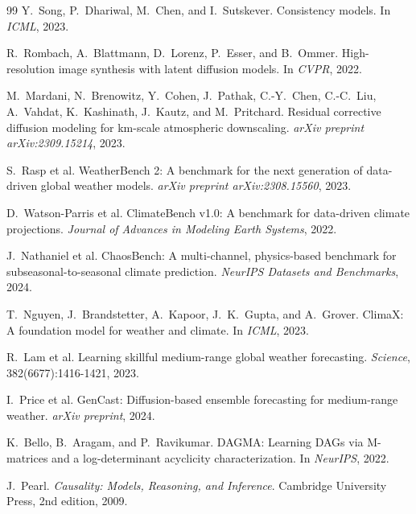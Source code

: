 \documentclass[14pt,a4paper,openany]{extreport}
\begin{document}
\begin{thebibliography}{99}
 Y.~Song, P.~Dhariwal, M.~Chen, and I.~Sutskever. Consistency models. In \emph{ICML}, 2023.

 R.~Rombach, A.~Blattmann, D.~Lorenz, P.~Esser, and B.~Ommer. High-resolution image synthesis with latent diffusion models. In \emph{CVPR}, 2022.

 M.~Mardani, N.~Brenowitz, Y.~Cohen, J.~Pathak, C.-Y.~Chen, C.-C.~Liu, A.~Vahdat, K.~Kashinath, J.~Kautz, and M.~Pritchard. Residual corrective diffusion modeling for km-scale atmospheric downscaling. \emph{arXiv preprint arXiv:2309.15214}, 2023.

 S.~Rasp et al. WeatherBench 2: A benchmark for the next generation of data-driven global weather models. \emph{arXiv preprint arXiv:2308.15560}, 2023.

 D.~Watson-Parris et al. ClimateBench v1.0: A benchmark for data-driven climate projections. \emph{Journal of Advances in Modeling Earth Systems}, 2022.

 J.~Nathaniel et al. ChaosBench: A multi-channel, physics-based benchmark for subseasonal-to-seasonal climate prediction. \emph{NeurIPS Datasets and Benchmarks}, 2024.

 T.~Nguyen, J.~Brandstetter, A.~Kapoor, J.~K.~Gupta, and A.~Grover. ClimaX: A foundation model for weather and climate. In \emph{ICML}, 2023.

 R.~Lam et al. Learning skillful medium-range global weather forecasting. \emph{Science}, 382(6677):1416-1421, 2023.

 I.~Price et al. GenCast: Diffusion-based ensemble forecasting for medium-range weather. \emph{arXiv preprint}, 2024.

 K.~Bello, B.~Aragam, and P.~Ravikumar. DAGMA: Learning DAGs via M-matrices and a log-determinant acyclicity characterization. In \emph{NeurIPS}, 2022.

 J.~Pearl. \emph{Causality: Models, Reasoning, and Inference}. Cambridge University Press, 2nd edition, 2009.

\end{thebibliography}
\end{document}
